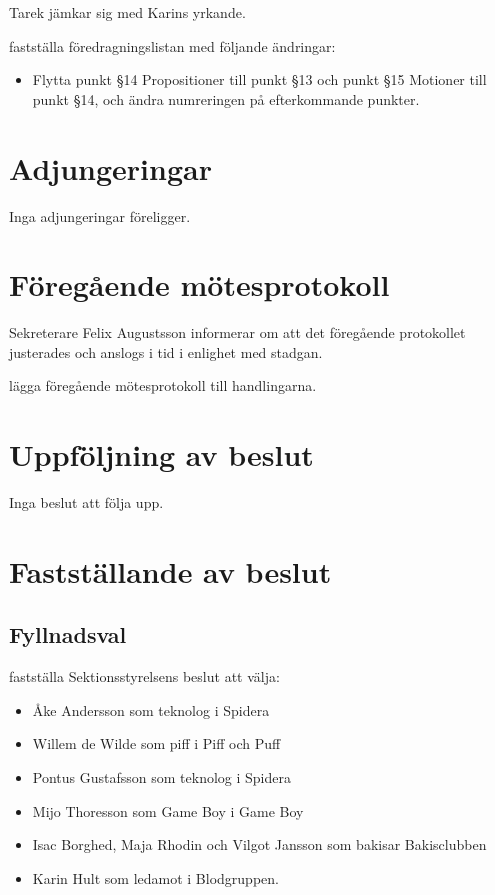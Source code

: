 \documentclass[hidelinks]{sektionsmote}
\begin{document}
Tarek jämkar sig med Karins yrkande.
\begin{beslut}
  \item fastställa föredragningslistan med följande ändringar:
  \begin{itemize}
    \item Flytta punkt §14 Propositioner till punkt §13 och punkt §15 Motioner till punkt §14, och ändra numreringen på efterkommande punkter.
  \end{itemize}
\end{beslut}


\section{Adjungeringar}
Inga adjungeringar föreligger.


\section{Föregående mötesprotokoll}
Sekreterare Felix Augustsson informerar om att det föregående protokollet justerades och anslogs i tid i enlighet med stadgan.
\begin{beslut}
    \item lägga föregående mötesprotokoll till handlingarna. 
\end{beslut}


\section{Uppföljning av beslut}
Inga beslut att följa upp.


\section{Fastställande av beslut}

\subsection{Fyllnadsval}
\begin{beslut}
  \item fastställa Sektionsstyrelsens beslut att välja:
  \begin{itemize}
      \item Åke Andersson som teknolog i Spidera
      \item Willem de Wilde som piff i Piff och Puff
      \item Pontus Gustafsson som teknolog i Spidera
      \item Mijo Thoresson som Game Boy i Game Boy
      \item Isac Borghed, Maja Rhodin och Vilgot Jansson som bakisar Bakisclubben
      \item Karin Hult som ledamot i Blodgruppen.
  \end{itemize}
\end{beslut}
\end{document}
